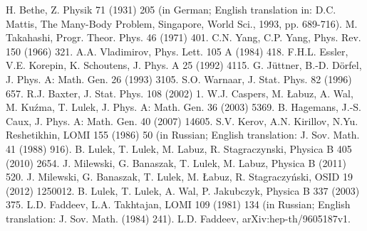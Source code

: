 \documentclass{elsarticle}
\begin{document}
\begin{thebibliography}{99}
 H. Bethe, Z. Physik 71 (1931) 205 (in German; English translation in: D.C. Mattis, The Many-Body Problem, Singapore, World Sci., 1993, pp. 689-716).
 M. Takahashi, Progr. Theor. Phys. 46 (1971) 401.
 C.N. Yang, C.P. Yang, Phys. Rev. 150 (1966) 321.
 A.A. Vladimirov, Phys. Lett. 105 A (1984) 418.
 F.H.L. Essler, V.E. Korepin, K. Schoutens, J. Phys. A 25 (1992) 4115. 
G. J\"uttner, B.-D. D\"orfel, J. Phys. A: Math. Gen. 26 (1993) 3105.
 S.O. Warnaar, J. Stat. Phys. 82 (1996) 657.
 R.J. Baxter, J. Stat. Phys. 108 (2002) 1. %
 W.J. Caspers, M. {\L}abuz, A. Wal, M. Ku\'zma, T. Lulek, J. Phys. A: Math. Gen. 36 (2003) 5369.
 B. Hagemans, J.-S. Caux, J. Phys. A: Math. Gen. 40 (2007) 14605.
 S.V. Kerov, A.N. Kirillov, N.Yu. Reshetikhin, LOMI 155 (1986) 50
(in Russian; English translation: J. Sov. Math. 41 (1988) 916). 
 B. Lulek, T. Lulek, M. Labuz, R. Stagraczynski, Physica B 405 (2010) 2654.
 J. Milewski, G. Banaszak, T. Lulek, M. Labuz, Physica B (2011) 520.
 J. Milewski, G. Banaszak, T. Lulek, M. \L{}abuz, R. Stagraczy\'nski, OSID 19 (2012) 1250012.
 B. Lulek, T. Lulek, A. Wal, P. Jakubczyk, Physica B 337 (2003) 375.
 L.D. Faddeev, L.A. Takhtajan, LOMI 109 (1981) 134
(in Russian; English translation: J. Sov. Math. (1984) 241).
 L.D. Faddeev, arXiv:hep-th/9605187v1.
\end{thebibliography}
\end{document}
